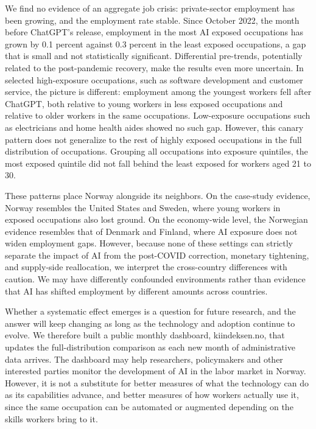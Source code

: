 \documentclass[12pt]{article}
\begin{document}
We find no evidence of an aggregate job crisis: private-sector employment has been growing, and the employment rate stable. Since October 2022, the month before ChatGPT's release, employment in the most AI exposed occupations has grown by 0.1 percent against 0.3 percent in the least exposed occupations, a gap that is small and not statistically significant. Differential pre-trends, potentially related to the post-pandemic recovery, make the results even more uncertain. In selected high-exposure occupations, such as software development and customer service, the picture is different: employment among the youngest workers fell after ChatGPT, both relative to young workers in less exposed occupations and relative to older workers in the same occupations. Low-exposure occupations such as electricians and home health aides showed no such gap. However, this canary pattern does not generalize to the rest of highly exposed occupations in the full distribution of occupations. Grouping all occupations into exposure quintiles, the most exposed quintile did not fall behind the least exposed for workers aged 21 to 30.

These patterns place Norway alongside its neighbors. On the case-study evidence, Norway resembles the United States and Sweden, where young workers in exposed occupations also lost ground. On the economy-wide level, the Norwegian evidence resembles that of Denmark and Finland, where AI exposure does not widen employment gaps. However, because none of these settings can strictly separate the impact of AI from the post-COVID correction, monetary tightening, and supply-side reallocation, we interpret the cross-country differences with caution. We may have differently confounded environments rather than evidence that AI has shifted employment by different amounts across countries. 

Whether a systematic effect emerges is a question for future research, and the answer will keep changing as long as the technology and adoption continue to evolve. We therefore built a public monthly dashboard, kiindeksen.no, that updates the full-distribution comparison as each new month of administrative data arrives. The dashboard may help researchers, policymakers and other interested parties monitor the development of AI in the labor market in Norway. However, it is not a substitute for better measures of what the technology can do as its capabilities advance, and better measures of how workers actually use it, since the same occupation can be automated or augmented depending on the skills workers bring to it.
\end{document}
